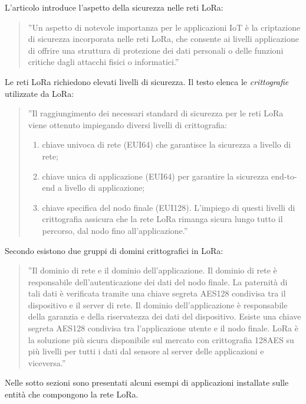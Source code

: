 \documentclass[a4paper]{report} %
\begin{document}
L'articolo \cite{art:rif.20} introduce l'aspetto della sicurezza nelle reti LoRa:
\begin{quote}
	''Un aspetto di notevole importanza per le applicazioni IoT è la criptazione di sicurezza incorporata nelle reti LoRa, che consente ai livelli applicazione di offrire una struttura di protezione dei dati personali o delle funzioni critiche dagli attacchi fisici o informatici.''
\end{quote} 
 Le reti LoRa richiedono elevati livelli di sicurezza. Il testo \cite{art:rif.27} elenca le \textit{crittografie} utilizzate da LoRa:
\begin{quote}
	''Il raggiungimento dei necessari standard di sicurezza per le reti LoRa viene ottenuto impiegando diversi livelli di crittografia:
	\begin{enumerate}
		\item chiave univoca di rete (EUI64) che garantisce la sicurezza a livello di rete;
		\item chiave unica di applicazione (EUI64) per garantire la sicurezza end-to-end a livello di applicazione;
		\item chiave specifica del nodo finale (EUI128).
		L’impiego di questi livelli di crittografia assicura che la rete LoRa rimanga sicura lungo tutto il percorso, dal nodo fino all’applicazione.''
	\end{enumerate}
\end{quote}
Secondo \cite{art:rif.30} esistono due gruppi di domini crittografici in LoRa: 
\begin{quote}
	''Il dominio di rete e il dominio dell'applicazione. Il dominio di rete è responsabile dell'autenticazione dei dati del nodo finale. La paternità di tali dati è verificata tramite una chiave segreta AES128 condivisa tra il dispositivo e il server di rete. Il dominio dell'applicazione è responsabile della garanzia e della riservatezza dei dati del dispositivo. Esiste una chiave segreta AES128 condivisa tra l'applicazione utente e il nodo finale. LoRa è la soluzione più sicura disponibile sul mercato con crittografia 128AES su più livelli per tutti i dati dal sensore al server delle applicazioni e viceversa.''
\end{quote}
Nelle sotto sezioni sono presentati alcuni esempi di applicazioni installate sulle entità che compongono la rete LoRa.
\end{document}
